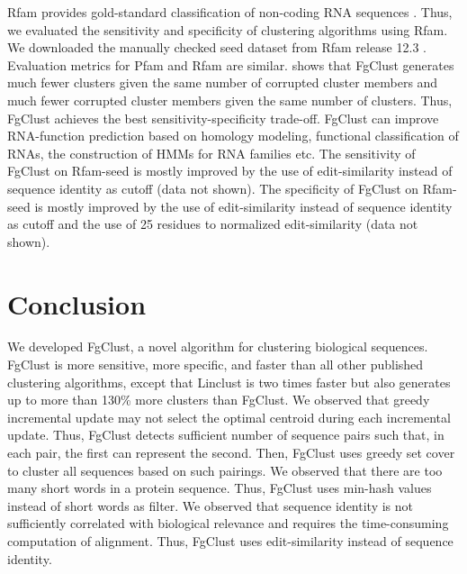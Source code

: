 \documentclass[11pt,letterpaper]{article}
\begin{document}
Rfam provides gold-standard classification of non-coding RNA sequences \citep{nawrocki2014rfam}.
Thus, we evaluated the sensitivity and specificity of clustering algorithms using Rfam. 
We downloaded the manually checked seed dataset from Rfam release 12.3 \citep{nawrocki2014rfam}.
Evaluation metrics for Pfam and Rfam are similar.
 shows that FgClust generates much fewer clusters given the same number of corrupted cluster members and much fewer corrupted cluster members given the same number of clusters.
Thus, FgClust achieves the best sensitivity-specificity trade-off.
FgClust can improve RNA-function prediction based on homology modeling, functional classification of RNAs, the construction of HMMs for RNA families etc.
The sensitivity of FgClust on Rfam-seed is mostly improved by the use of edit-similarity instead of sequence identity as cutoff (data not shown).
The specificity of FgClust on Rfam-seed is mostly improved by the use of edit-similarity instead of sequence identity as cutoff and the use of 25 residues to normalized edit-similarity (data not shown). 

\section{Conclusion}

We developed FgClust, a novel algorithm for clustering biological sequences.
FgClust is more sensitive, more specific, and faster than all other published clustering algorithms, except that Linclust is two times faster but also generates up to more than 130\% more clusters than FgClust.
We observed that greedy incremental update may not select the optimal centroid during each incremental update.
Thus, FgClust detects sufficient number of sequence pairs such that, in each pair, the first can represent the second.
Then, FgClust uses greedy set cover to cluster all sequences based on such pairings.
We observed that there are too many short words in a protein sequence.
Thus, FgClust uses min-hash values instead of short words as filter.
We observed that sequence identity is not sufficiently correlated with biological relevance and requires the time-consuming computation of alignment.
Thus, FgClust uses edit-similarity instead of sequence identity.
\end{document}
